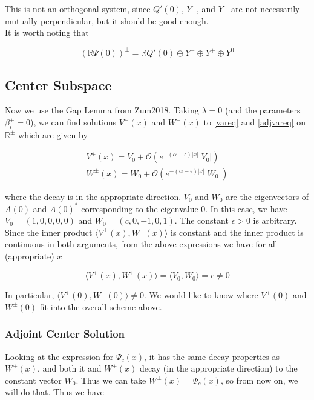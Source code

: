 \documentclass[12pt]{article}
\def\R{{\mathbb R}}
\begin{document}
This is not an orthogonal system, since $Q'(0)$, $Y^+$, and $Y^-$ are not necessarily mutually perpendicular, but it should be good enough.\\

It is worth noting that

\[
(\R \Psi(0))^\perp = \R Q'(0) \oplus Y^- \oplus Y^+ \oplus Y^0
\]

\subsection*{Center Subspace}

Now we use the Gap Lemma from Zum2018. Taking $\lambda = 0$ (and the parameters $\beta_i^\pm = 0$), we can find solutions $V^\pm(x)$ and $W^\pm(x)$ to \eqref{vareq} and \eqref{adjvareq} on $\R^\pm$ which are given by

\begin{align*}
V^\pm(x) = V_0 + \mathcal{O}(e^{-(\alpha - \epsilon)|x|}|V_0|) \\
W^\pm(x) = W_0 + \mathcal{O}(e^{-(\alpha - \epsilon)|x|}|W_0|)
\end{align*}

where the decay is in the appropriate direction. $V_0$ and $W_0$ are the eigenvectors of $A(0)$ and $A(0)^*$ corresponding to the eigenvalue 0. In this case, we have $V_0 = (1, 0, 0, 0, 0)$ and $W_0 = (c, 0, -1, 0, 1)$. The constant $\epsilon > 0$ is arbitrary. Since the inner product $\langle V^\pm(x), W^\pm(x) \rangle$ is constant and the inner product is continuous in both arguments, from the above expressions we have for all (appropriate) $x$

\[
\langle V^\pm(x), W^\pm(x) \rangle = \langle V_0, W_0 \rangle = c \neq 0
\]

In particular, $\langle V^\pm(0), W^\pm(0) \rangle \neq 0$. We would like to know where $V^\pm(0)$ and $W^\pm(0)$ fit into the overall scheme above. \\

\subsubsection*{Adjoint Center Solution}

Looking at the expression for $\Psi_c(x)$, it has the same decay properties as $W^\pm(x)$, and both it and $W^\pm(x)$ decay (in the appropriate direction) to the constant vector $W_0$. Thus we can take $W^\pm(x) = \Psi_c(x)$, so from now on, we will do that. Thus we have
\end{document}
